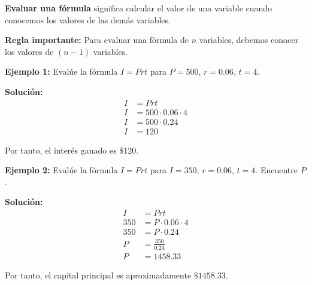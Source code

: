 \begin{center}
\end{center}


\begin{definition}
\textbf{Evaluar una fórmula} significa calcular el valor de una variable cuando conocemos los valores de las demás variables.
\end{definition}

\textbf{Regla importante:} Para evaluar una fórmula de $n$ variables, debemos conocer los valores de $(n-1)$ variables.

\begin{example}
\textbf{Ejemplo 1:} Evalúe la fórmula $I = Prt$ para $P = 500$, $r = 0.06$, $t = 4$.

\textbf{Solución:}
\begin{align}
I &= Prt\\
I &= 500 \cdot 0.06 \cdot 4\\
I &= 500 \cdot 0.24\\
I &= 120
\end{align}

Por tanto, el interés ganado es $\$120$.
\end{example}

\begin{example}
\textbf{Ejemplo 2:} Evalúe la fórmula $I = Prt$ para $I = 350$, $r = 0.06$, $t = 4$. Encuentre $P$.

\textbf{Solución:}
\begin{align}
I &= Prt\\
350 &= P \cdot 0.06 \cdot 4\\
350 &= P \cdot 0.24\\
P &= \frac{350}{0.24}\\
P &= 1458.33
\end{align}

Por tanto, el capital principal es aproximadamente $\$1458.33$.
\end{example}


